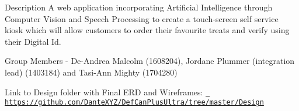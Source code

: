 Description A web application incorporating Artificial Intelligence through Computer Vision and Speech Processing to create a touch-\/screen self service kiosk which will allow customers to order their favourite treats and verify using their Digital Id.

Group Members -\/ De-\/\+Andrea Malcolm (1608204), Jordane Plummer (integration lead) (1403184) and Tasi-\/\+Ann Mighty (1704280)

Link to Design folder with Final E\+RD and Wireframes\+: \href{https://github.com/DanteXYZ/DefCanPlusUltra/tree/master/Design}{\texttt{ https\+://github.\+com/\+Dante\+X\+Y\+Z/\+Def\+Can\+Plus\+Ultra/tree/master/\+Design}} 